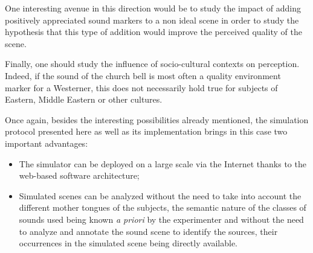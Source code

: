 \documentclass[12pt]{elsarticle}
\begin{document}
One interesting avenue in this direction would be to study the impact of adding positively appreciated sound markers to a non ideal scene in order to study the hypothesis that this type of addition would improve the perceived quality of the scene.


Finally, one should study the influence of socio-cultural contexts on perception. Indeed, if the sound of the church bell is most often a quality environment marker for a Westerner, this does not necessarily hold true for subjects of Eastern, Middle Eastern or other cultures.


Once again, besides the interesting possibilities already mentioned, the simulation protocol presented here as well as its implementation brings in this case two important advantages:


\begin{itemize}
\item The simulator can be deployed on a large scale via the Internet thanks to the web-based software architecture;
\item Simulated scenes can be analyzed without the need to take into account the different mother tongues of the subjects, the semantic nature of the classes of sounds used being known \emph{a priori} by the experimenter and without the need to analyze and annotate the sound scene to identify the sources, their occurrences in the simulated scene being directly available.
\end{itemize}
\end{document}
